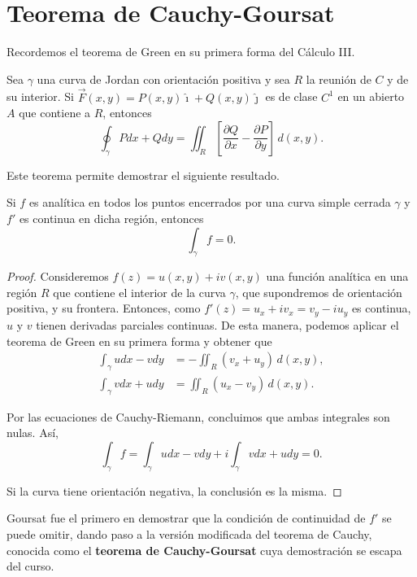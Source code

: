 \section{Teorema de Cauchy-Goursat}

Recordemos el teorema de Green en su primera forma del Cálculo III.

\begin{teorema}
Sea $\gamma$ una curva de Jordan con orientación positiva y sea $R$ la reunión de $C$ y de su interior. Si $\Vec{F}(x,y) = P(x,y) \hat{\imath} + Q(x,y) \hat{\jmath}$ es de clase $C^1$ en un abierto $A$ que contiene a $R$, entonces
$$\oint_{\gamma} Pdx + Qdy = \iint_R \left[ \frac{\partial Q}{\partial x} - \frac{\partial P}{\partial y}\right] \,d(x,y).$$
\end{teorema}

Este teorema permite demostrar el siguiente resultado.

\begin{teorema}[de Cauchy]
Si $f$ es analítica en todos los puntos encerrados por una curva simple cerrada $\gamma$ y $f'$ es continua en dicha región, entonces
$$\int_{\gamma} f = 0.$$
\end{teorema}

\begin{proof}
Consideremos $f(z) = u(x,y) + iv(x,y)$ una función analítica en una región $R$ que contiene el interior de la curva $\gamma$, que supondremos de orientación positiva, y su frontera. Entonces, como $f'(z) = u_x + i v_x = v_y - iu_y$  es continua, $u$ y $v$ tienen derivadas parciales continuas. De esta manera, podemos aplicar el teorema de Green en su primera forma y obtener que
\begin{align*}
    \int_{\gamma} udx - vdy &= - \iint_R (v_x + u_y) \,d(x,y), \\
    \int_{\gamma} vdx + udy &=  \iint_R (u_x - v_y) \,d(x,y).
\end{align*}

Por las ecuaciones de Cauchy-Riemann, concluimos que ambas integrales son nulas. Así,
$$\int_{\gamma} f = \int_{\gamma} udx - vdy + i \int_{\gamma} vdx + udy = 0.$$

Si la curva tiene orientación negativa, la conclusión es la misma.

\end{proof}

Goursat fue el primero en demostrar que la condición de continuidad de $f'$ se puede omitir, dando paso a la versión modificada del teorema de Cauchy, conocida como el \textbf{teorema de Cauchy-Goursat} cuya demostración se escapa del curso.

